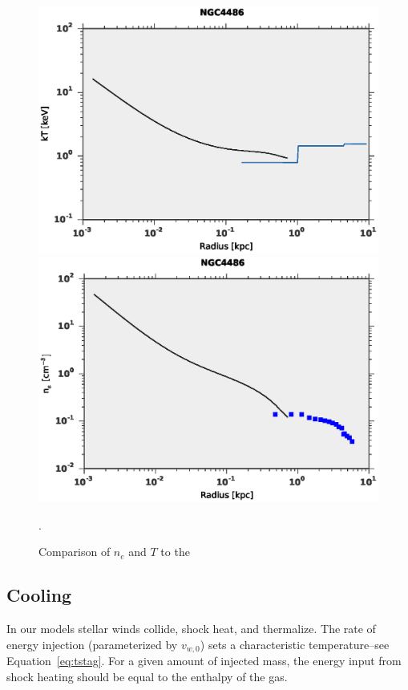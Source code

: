 \documentclass[usenatbib,fleqn]{mn2e}
\newcommand{\vwO}{v_{w,0}}
\begin{document}
\begin{figure}
\includegraphics[width=\columnwidth]{T_compare.eps}
\includegraphics[width=\columnwidth]{dens_compare.eps}
\caption{\label{fig:allen_compare} Comparison of $n_e$ and $T$ to the \citealt{AllenDunn+:2006a}}. 
\end{figure}


 
\subsection{Cooling}
\label{sec:cooling}
In our models stellar winds collide, shock heat, and thermalize. The
rate of energy injection (parameterized by $\vwO$) sets a
characteristic temperature--see Equation~\ref{eq:tstag}.  For a given
amount of injected mass, the energy input from shock heating should be
equal to the enthalpy of the gas.
\end{document}
